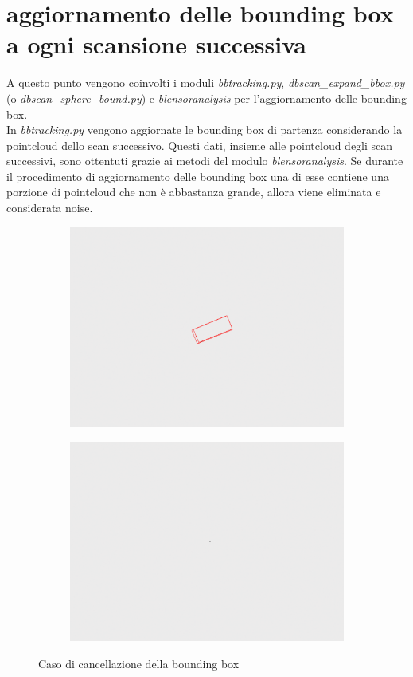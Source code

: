 \documentclass[italian]{report}
\begin{document}
\section{aggiornamento delle bounding box a ogni scansione successiva}
A questo punto vengono coinvolti i moduli \textit{bbtracking.py}, \textit{dbscan\_expand\_bbox.py} (o \textit{dbscan\_sphere\_bound.py}) e \textit{blensoranalysis} per l'aggiornamento delle bounding box.\\
In \textit{bbtracking.py} vengono aggiornate le bounding box di partenza considerando la pointcloud dello scan successivo. Questi dati, insieme alle pointcloud degli scan successivi, sono ottentuti grazie ai metodi del modulo \textit{blensoranalysis}. Se durante il procedimento di aggiornamento delle bounding box una di esse contiene una porzione di pointcloud che non è abbastanza grande, allora viene eliminata e considerata noise.\\
\begin{figure}[H]
	\centering
	\begin{subfigure}{0.45\textwidth}
		\includegraphics[width=\textwidth]{bb}
	\end{subfigure}
	\begin{subfigure}{0.45\textwidth}
		\includegraphics[width=\textwidth]{nobb}
	\end{subfigure}
	\footnotesize
	\caption{Caso di cancellazione della bounding box}
\end{figure}
\end{document}
